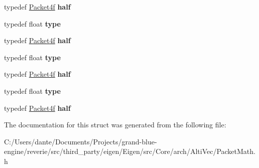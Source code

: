 \begin{DoxyCompactItemize}
typedef \mbox{\hyperlink{struct_eigen_1_1internal_1_1_packet4f}{Packet4f}} {\bfseries half}
\item 
\mbox{\label{struct_eigen_1_1internal_1_1unpacket__traits_3_01_packet4f_01_4_aec581636b9b1f84c6f7900dd54f7933e}} 
typedef float {\bfseries type}
\item 
\mbox{\label{struct_eigen_1_1internal_1_1unpacket__traits_3_01_packet4f_01_4_a6fd79255574a93f1ca0eb2eb62ca1417}} 
typedef \mbox{\hyperlink{struct_eigen_1_1internal_1_1_packet4f}{Packet4f}} {\bfseries half}
\item 
\mbox{\label{struct_eigen_1_1internal_1_1unpacket__traits_3_01_packet4f_01_4_aec581636b9b1f84c6f7900dd54f7933e}} 
typedef float {\bfseries type}
\item 
\mbox{\label{struct_eigen_1_1internal_1_1unpacket__traits_3_01_packet4f_01_4_a6fd79255574a93f1ca0eb2eb62ca1417}} 
typedef \mbox{\hyperlink{struct_eigen_1_1internal_1_1_packet4f}{Packet4f}} {\bfseries half}
\item 
\mbox{\label{struct_eigen_1_1internal_1_1unpacket__traits_3_01_packet4f_01_4_aec581636b9b1f84c6f7900dd54f7933e}} 
typedef float {\bfseries type}
\item 
\mbox{\label{struct_eigen_1_1internal_1_1unpacket__traits_3_01_packet4f_01_4_a6fd79255574a93f1ca0eb2eb62ca1417}} 
typedef \mbox{\hyperlink{struct_eigen_1_1internal_1_1_packet4f}{Packet4f}} {\bfseries half}
\end{DoxyCompactItemize}


The documentation for this struct was generated from the following file\+:\begin{DoxyCompactItemize}
\item 
C\+:/\+Users/dante/\+Documents/\+Projects/grand-\/blue-\/engine/reverie/src/third\+\_\+party/eigen/\+Eigen/src/\+Core/arch/\+Alti\+Vec/Packet\+Math.\+h\end{DoxyCompactItemize}
